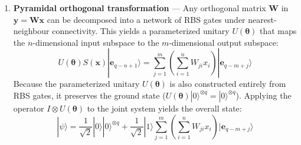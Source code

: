 \documentclass{iopjournal}
\begin{document}
\begin{enumerate}
    Because the unitary $S(\mathbf{x})$ is constructed entirely from Reconfigurable Beam Splitter (RBS) gates, which preserve the $|00\rangle$ state, it has no effect on the ground state ($S(\mathbf{x})|0\rangle^{\otimes q} = |0\rangle^{\otimes q}$). Consequently, applying the operator $I \otimes S(\mathbf{x})$ to the full system transforms the overall state to:
    \[|\psi\rangle = \dfrac{1}{\sqrt{2}}|0\rangle|0\rangle^{\otimes q} + \dfrac{1}{\sqrt{2}}|1\rangle\sum_{i=1}^{n} x_i|\mathbf{e}_{q-n+i}\rangle\]

    \item \textbf{Pyramidal orthogonal transformation} — Any orthogonal matrix $\mathbf{W}$ in $\mathbf{y} = \mathbf{Wx}$ can be decomposed into a network of RBS gates under nearest-neighbour connectivity. This yields a parameterized unitary $U(\boldsymbol{\theta})$ that maps the $n$-dimensional input subspace to the $m$-dimensional output subspace:
    \[U(\boldsymbol{\theta})S(\mathbf{x})|\mathbf{e}_{q-n+1}\rangle = \sum_{j=1}^m \left( \sum_{i=1}^n {W}_{ji}x_{i} \right) |\mathbf{e}_{q-m+j}\rangle\]
    Because the parameterized unitary $U(\boldsymbol{\theta})$ is also constructed entirely from RBS gates, it preserves the ground state ($U(\boldsymbol{\theta})|0\rangle^{\otimes q} = |0\rangle^{\otimes q}$). Applying the operator $I \otimes U(\boldsymbol{\theta})$ to the joint system yields the overall state:\[
    |\psi\rangle = \dfrac{1}{\sqrt{2}}|0\rangle|0\rangle^{\otimes q} + \dfrac{1}{\sqrt{2}}|1\rangle\sum_{j=1}^m \left( \sum_{i=1}^n {W}_{ji}x_{i} \right)|\mathbf{e}_{q-m+j}\rangle\]
    

\end{enumerate}
\end{document}
